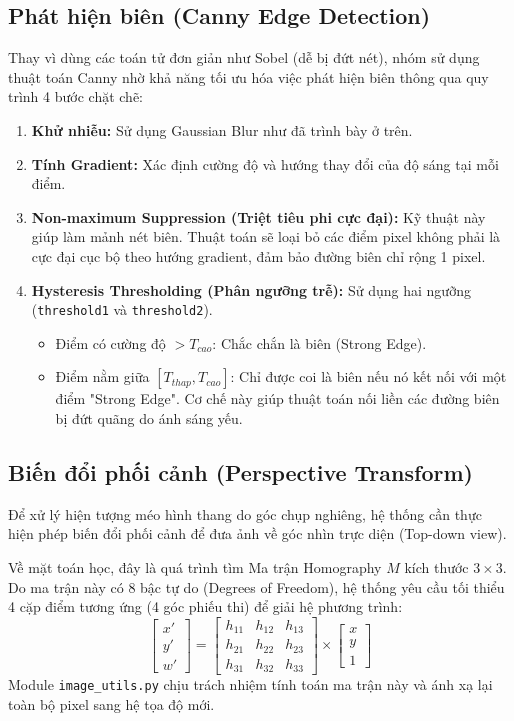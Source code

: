 \documentclass[6pt, a4paper]{report}
\begin{document}
	\subsection{Phát hiện biên (Canny Edge Detection)}
	Thay vì dùng các toán tử đơn giản như Sobel (dễ bị đứt nét), nhóm sử dụng thuật toán Canny nhờ khả năng tối ưu hóa việc phát hiện biên thông qua quy trình 4 bước chặt chẽ:
	\begin{enumerate}
		\item \textbf{Khử nhiễu:} Sử dụng Gaussian Blur như đã trình bày ở trên.
		\item \textbf{Tính Gradient:} Xác định cường độ và hướng thay đổi của độ sáng tại mỗi điểm.
		\item \textbf{Non-maximum Suppression (Triệt tiêu phi cực đại):} Kỹ thuật này giúp làm mảnh nét biên. Thuật toán sẽ loại bỏ các điểm pixel không phải là cực đại cục bộ theo hướng gradient, đảm bảo đường biên chỉ rộng 1 pixel.
		\item \textbf{Hysteresis Thresholding (Phân ngưỡng trễ):} Sử dụng hai ngưỡng (\texttt{threshold1} và \texttt{threshold2}).
		\begin{itemize}
			\item Điểm có cường độ $> T_{cao}$: Chắc chắn là biên (Strong Edge).
			\item Điểm nằm giữa $[T_{thap}, T_{cao}]$: Chỉ được coi là biên nếu nó kết nối với một điểm "Strong Edge". Cơ chế này giúp thuật toán nối liền các đường biên bị đứt quãng do ánh sáng yếu.
		\end{itemize}
	\end{enumerate}
	
	\subsection{Biến đổi phối cảnh (Perspective Transform)}
	Để xử lý hiện tượng méo hình thang do góc chụp nghiêng, hệ thống cần thực hiện phép biến đổi phối cảnh để đưa ảnh về góc nhìn trực diện (Top-down view).
	
	Về mặt toán học, đây là quá trình tìm Ma trận Homography $M$ kích thước $3 \times 3$. Do ma trận này có 8 bậc tự do (Degrees of Freedom), hệ thống yêu cầu tối thiểu 4 cặp điểm tương ứng (4 góc phiếu thi) để giải hệ phương trình:
	\begin{equation}
		\begin{bmatrix} x' \\ y' \\ w' \end{bmatrix} = \begin{bmatrix} h_{11} & h_{12} & h_{13} \\ h_{21} & h_{22} & h_{23} \\ h_{31} & h_{32} & h_{33} \end{bmatrix} \times \begin{bmatrix} x \\ y \\ 1 \end{bmatrix}
	\end{equation}
	Module \texttt{image\_utils.py} chịu trách nhiệm tính toán ma trận này và ánh xạ lại toàn bộ pixel sang hệ tọa độ mới.
	
\end{document}
